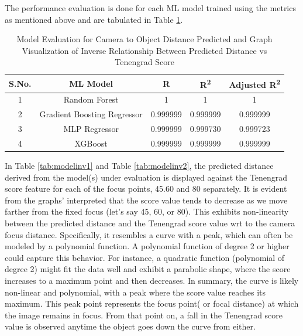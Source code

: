 \documentclass[sn-mathphys]{sn-jnl}%
\theoremstyle{thmstyleone}%
\theoremstyle{thmstyletwo}%
\theoremstyle{thmstylethree}%
\begin{document}
The performance evaluation is done for each ML model trained using the metrics as mentioned above and are tabulated in Table  \ref{tab:modeleva}. 
\begin{table}[!htbp]
\centering
\caption{Model Evaluation for Camera to Object Distance Predicted and Graph Visualization of Inverse Relationship Between Predicted Distance vs Tenengrad Score}
\label{tab:modeleva}
\begin{tabular}{ c c c c c }
\hline 
S.No. & ML Model & R & R\textsuperscript{2} & Adjusted R\textsuperscript{2} \\
\hline
1 & Random Forest & 1 & 1 & 1 \\
\hline
2 & Gradient Boosting Regressor & 0.999999 & 0.999999 &  0.999999 \\
\hline
3 & MLP Regressor &0.999999 & 0.999730 &0.999723 \\
\hline
4 & XGBoost &0.999999 &0.999999 & 0.999999 \\
\hline
\end{tabular}
\end{table}


In Table \ref{tab:modelinv1} and Table \ref{tab:modelinv2}, the predicted distance derived from the model(s) under evaluation is displayed against the Tenengrad score feature for each of the focus points, 45.60 and 80 separately.  It is evident from the graphs' interpreted that the score value tends to decrease as we move farther from the fixed focus (let's say 45, 60, or 80). This exhibits non-linearity between the predicted distance and the Tenengrad score value wrt to the camera focus distance.   Specifically, it resembles a curve with a peak, which can often be modeled by a polynomial function. A polynomial function of degree 2 or higher could capture this behavior. For instance, a quadratic function (polynomial of degree 2) might fit the data well and exhibit a parabolic shape, where the score increases to a maximum point and then decreases. In summary, the curve is likely non-linear and polynomial, with a peak where the score value reaches its maximum. This peak point represents the focus point( or focal distance) at which the image remains in focus. From that point on, a fall in the Tenengrad score value is observed anytime the object goes down the curve from either.
\end{document}
